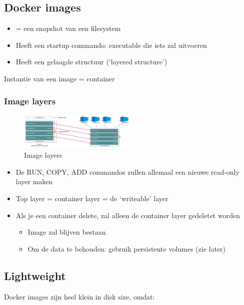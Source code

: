\documentclass{article}
\begin{document}
\subsection{Docker images}


\begin{itemize}
    \item = een snapshot van een filesystem
    \item Heeft een startup commando: executable die iets zal uitvoeren
    \item Heeft een gelaagde structuur (`layered structure')
\end{itemize}

Instantie van een image = container

\subsubsection{Image layers}

\begin{figure}[H]
    \centering
    \includegraphics[width=0.5\textwidth]{docker-image-layers.png}
    \caption{Image layers}
\end{figure}

\begin{itemize}
    \item De RUN, COPY, ADD commandos zullen allemaal een nieuwe read-only layer maken
    \item Top layer = container layer = de `writeable' layer
    \item Als je een container delete, zal alleen de container layer gedeletet worden
    \begin{itemize}
        \item Image zal blijven bestaan
        \item Om de data te behouden: gebruik persistente volumes (zie later)
    \end{itemize}
\end{itemize}

\subsection{Lightweight}

Docker images zijn heel klein in disk size, omdat:
\end{document}
